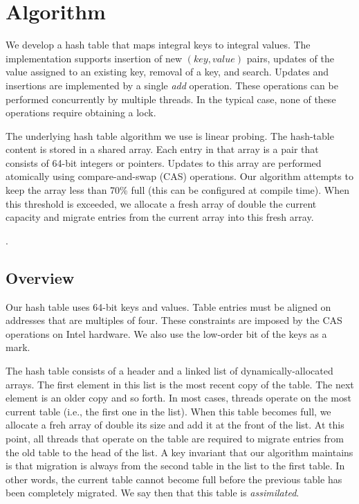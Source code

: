 \section{Algorithm}
\label{sec:algo}

We develop a hash table that maps integral keys to integral
values. The implementation supports insertion of new $(key,value)$
pairs, updates of the value assigned to an existing key, removal of a
key, and search. Updates and insertions are implemented by a single
{\em add\/} operation. These operations can be performed concurrently
by multiple threads. In the typical case, none of these operations
require obtaining a lock.

The underlying hash table algorithm we use is linear probing. The
hash-table content is stored in a shared array. Each entry in that
array is a pair that consists of 64-bit integers or pointers. Updates
to this array are performed atomically using compare-and-swap (CAS)
operations. Our algorithm attempts to keep the array less than 70\%
full (this can be configured at compile time). When this threshold is
exceeded, we allocate a fresh array of double the current capacity and
migrate entries from the current array into this fresh array.

.

\subsection{Overview}

Our hash table uses 64-bit keys and values. Table entries must be
aligned on addresses that are multiples of four. These constraints are
imposed by the CAS operations on Intel hardware. We also use the low-order
bit of the keys as a mark.

The hash table consists of a header and a linked list of
dynamically-allocated arrays.  The first element in this list is the
most recent copy of the table. The next element is an older copy and
so forth.  In most cases, threads operate on the most current table
(i.e., the first one in the list). When this table becomes full, we
allocate a freh array of double its size and add it at the front of
the list.  At this point, all threads that operate on the table are
required to migrate entries from the old table to the head of the
list. A key invariant that our algorithm maintains is that migration
is always from the second table in the list to the first table. In
other words, the current table cannot become full before the previous
table has been completely migrated.  We say then that this table is
{\em assimilated\/}.


